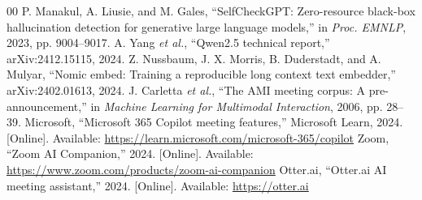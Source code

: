 \documentclass[conference]{IEEEtran}
\begin{document}
\begin{thebibliography}{00}
 P. Manakul, A. Liusie, and M. Gales, ``SelfCheckGPT: Zero-resource black-box hallucination detection for generative large language models,'' in \textit{Proc. EMNLP}, 2023, pp. 9004--9017.
 A. Yang \textit{et al.}, ``Qwen2.5 technical report,'' arXiv:2412.15115, 2024.
 Z. Nussbaum, J. X. Morris, B. Duderstadt, and A. Mulyar, ``Nomic embed: Training a reproducible long context text embedder,'' arXiv:2402.01613, 2024.
 J. Carletta \textit{et al.}, ``The AMI meeting corpus: A pre-announcement,'' in \textit{Machine Learning for Multimodal Interaction}, 2006, pp. 28--39.
 Microsoft, ``Microsoft 365 Copilot meeting features,'' Microsoft Learn, 2024. [Online]. Available: \url{https://learn.microsoft.com/microsoft-365/copilot}
 Zoom, ``Zoom AI Companion,'' 2024. [Online]. Available: \url{https://www.zoom.com/products/zoom-ai-companion}
 Otter.ai, ``Otter.ai AI meeting assistant,'' 2024. [Online]. Available: \url{https://otter.ai}
\end{thebibliography}
\end{document}
